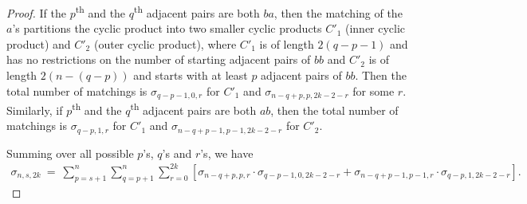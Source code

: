 \documentclass[11pt,reqno]{amsart}
\numberwithin{equation}{section}
\theoremstyle{plain}
\begin{document}
\begin{proof}
    If the $p$\textsuperscript{th} and the $q$\textsuperscript{th} adjacent pairs are both $ba$, then the matching of the $a$'s partitions the cyclic product into two smaller cyclic products $C'_{1}$ (inner cyclic product)  and $C'_{2}$ (outer cyclic product), where $C'_{1}$ is of length $2(q-p-1)$ and has no restrictions on the number of starting adjacent pairs of $bb$ and $C'_2$ is of length $2(n-(q-p))$ and starts with at least $p$ adjacent pairs of $bb$. Then the total number of matchings is $\sigma_{q-p-1, 0, r}$ for $C'_{1}$ and $\sigma_{n-q+p, p, 2k-2-r}$ for some $r$. Similarly, if $p$\textsuperscript{th} and the $q$\textsuperscript{th} adjacent pairs are both $ab$, then the total number of matchings is $\sigma_{q-p, 1, r}$ for $C'_{1}$ and $\sigma_{n-q+p-1, p-1, 2k-2-r}$ for $C'_{2}$.

    Summing over all possible $p$'s, $q$'s and $r$'s, we have 
    \begin{align}
    \sigma_{n, s, 2k} \ = \ \sum_{p = s + 1}^{n}\sum_{q = p + 1}^{n}\sum_{r = 0}^{2k}
    \left[\sigma_{n - q + p, p, r} \cdot \sigma_{q - p - 1, 0, 2k - 2 - r}+ \sigma_{n - q + p - 1, p - 1, r} \cdot \sigma_{q - p, 1, 2k - 2 - r}\right].
    \end{align}
    \end{proof}
\end{document}
